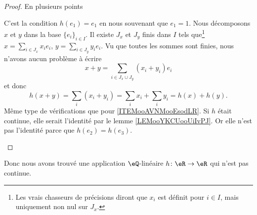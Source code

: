 \begin{proof}
	En plusieurs points
	\begin{subproof}
		 C'est la condition \( h(e_1)=e_1\) en nous souvenant que \( e_1=1\).
		 Nous décomposons \( x\) et \( y\) dans la base  \( \{ e_i \}_{i\in I}\). Il existe \( J_x\) et \( J_y \) finis dans \( I\) tels que\footnote{Les vrais chasseurs de précisions diront que \( x_i\) est définit pour \( i\in I\), mais uniquement non nul sur \( J_x\).} \( x=\sum_{i\in J_x}x_ie_i\), \( y=\sum_{i\in J_y}y_ie_i\). Vu que toutes les sommes sont finies, nous n'avons aucun problème à écrire
		\begin{equation}
			x+y=\sum_{i\in J_x\cup J_y}(x_i+y_i)e_i
		\end{equation}
		et donc
		\begin{equation}
			h(x+y)=\sum_i(x_i+y_i)=\sum_i x_i+\sum_i y_i=h(x)+h(y).
		\end{equation}
		Même type de vérifications que pour \ref{ITEMooAVNMooEsodLR}.
		Si \( h\) était continue, elle serait l'identité par le lemme \ref{LEMooYKCUooUiIvPJ}. Or elle n'est pas l'identité parce que \( h(e_2)=h(e_3)\).
	\end{subproof}
\end{proof}

Donc nous avons trouvé une application \( \eQ\)-linéaire \( h\colon \eR\to \eR\) qui n'est pas continue.
